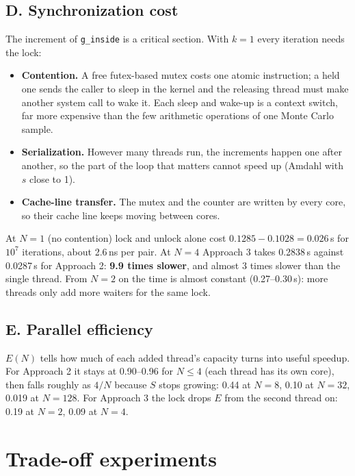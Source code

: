 \documentclass[11pt,a4paper]{article}
\newcommand{\code}[1]{\texttt{#1}}
\begin{document}
\subsection{D. Synchronization cost}
The increment of \code{g\_inside} is a critical section. With $k=1$ every iteration needs the lock:
\begin{itemize}[nosep]
  \item \textbf{Contention.} A free futex-based mutex costs one atomic instruction; a held one sends the caller to sleep in the kernel and the releasing thread must make another system call to wake it. Each sleep and wake-up is a context switch, far more expensive than the few arithmetic operations of one Monte Carlo sample.
  \item \textbf{Serialization.} However many threads run, the increments happen one after another, so the part of the loop that matters cannot speed up (Amdahl with $s$ close to 1).
  \item \textbf{Cache-line transfer.} The mutex and the counter are written by every core, so their cache line keeps moving between cores.
\end{itemize}
At $N=1$ (no contention) lock and unlock alone cost $0.1285-0.1028=0.026$\,s for $10^7$ iterations, about 2.6\,ns per pair. At $N=4$ Approach 3 takes 0.2838\,s against 0.0287\,s for Approach 2: \textbf{9.9 times slower}, and almost 3 times slower than the single thread. From $N=2$ on the time is almost constant (0.27--0.30\,s): more threads only add more waiters for the same lock.

\subsection{E. Parallel efficiency}
$E(N)$ tells how much of each added thread's capacity turns into useful speedup. For Approach 2 it stays at 0.90--0.96 for $N\le4$ (each thread has its own core), then falls roughly as $4/N$ because $S$ stops growing: 0.44 at $N=8$, 0.10 at $N=32$, 0.019 at $N=128$. For Approach 3 the lock drops $E$ from the second thread on: 0.19 at $N=2$, 0.09 at $N=4$.

\section{Trade-off experiments}
\end{document}
